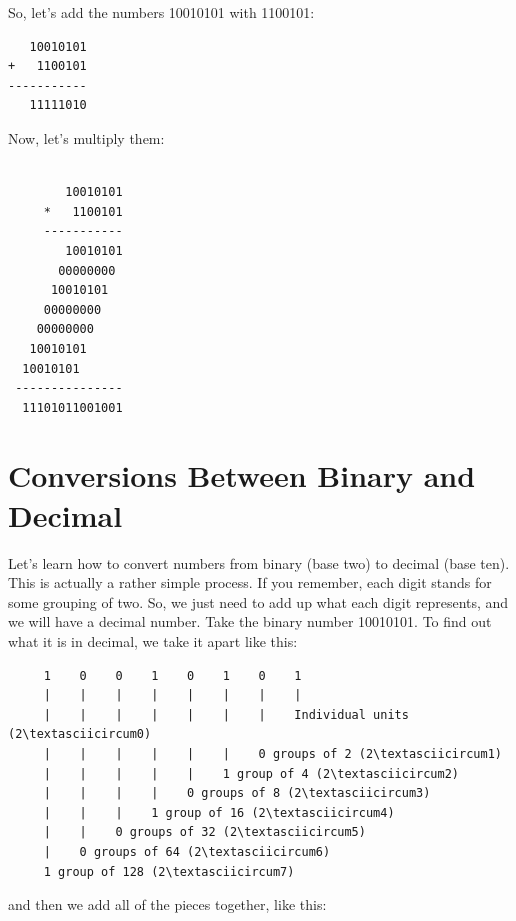 So, let's add the numbers 10010101 with 1100101:

\begin{simpletyping}
\begin{lstlisting}
   10010101
+   1100101
-----------
   11111010
\end{lstlisting}
\end{simpletyping}

Now, let's multiply them:

\begin{simpletyping}
\begin{lstlisting}

        10010101
     *   1100101
     -----------
        10010101
       00000000
      10010101
     00000000
    00000000
   10010101
  10010101
 ---------------
  11101011001001
\end{lstlisting}
\end{simpletyping}

\section{Conversions Between Binary and Decimal}

Let's learn how to convert numbers from binary (base two) to 
decimal (base ten).  This is actually a rather simple process.
If you remember, each digit stands for some grouping of two.  So,
we just need to add up what each digit represents, and we will have
a decimal number.  Take the binary number 10010101.  To find out
what it is in decimal, we take it apart like this:

\begin{simpletyping}
\begin{lstlisting}
     1    0    0    1    0    1    0    1
     |    |    |    |    |    |    |    |
     |    |    |    |    |    |    |    Individual units (2\textasciicircum0)
     |    |    |    |    |    |    0 groups of 2 (2\textasciicircum1)
     |    |    |    |    |    1 group of 4 (2\textasciicircum2)
     |    |    |    |    0 groups of 8 (2\textasciicircum3)
     |    |    |    1 group of 16 (2\textasciicircum4)
     |    |    0 groups of 32 (2\textasciicircum5)
     |    0 groups of 64 (2\textasciicircum6)
     1 group of 128 (2\textasciicircum7)
\end{lstlisting}
\end{simpletyping}

and then we add all of the pieces together, like this:

